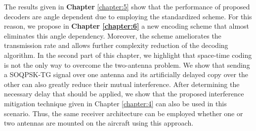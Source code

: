 The results given in \textbf{Chapter} \ref{chapter:5} show that the performance of proposed decoders are angle dependent due to employing the standardized scheme. For this reason, we propose in \textbf{Chapter \ref{chapter:6}} a new encoding scheme that almost eliminates this angle dependency. Moreover, the scheme ameliorates the transmission rate and allows further complexity reduction of the decoding algorithm. In the second part of this chapter, we highlight that space-time coding is not the only way to overcome the two-antenna problem. We show that sending a SOQPSK-TG signal over one antenna and its artificially delayed copy over the other can also greatly reduce their mutual interference. After determining the necessary delay that should be applied, we show that the proposed interference mitigation technique given in Chapter \ref{chapter:4} can also be used in this scenario. Thus, the same receiver architecture can be employed whether one or two antennas are mounted on the aircraft using this approach.  

